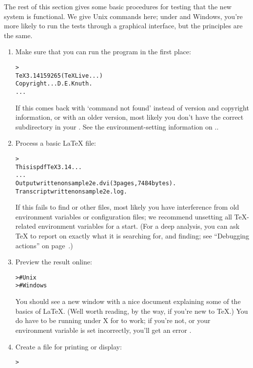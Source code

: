 \documentclass{article}
\begin{document}
The rest of this section gives some basic procedures for testing that
the new system is functional.  We give Unix commands here; under
\MacOSX{} and Windows, you're more likely to run the tests through a
graphical interface, but the principles are the same.

\begin{enumerate}

\item Make sure that you can run the  program in the first
place:
\begin{alltt}
> 
TeX 3.14159265 (TeX Live ...)
Copyright ... D.E. Knuth.
...
\end{alltt}
If this comes back with `command not found' instead of version and
copyright information, or with an older version, most likely you don't
have the correct  subdirectory in your .  See
the environment-setting information on \p.\pageref{sec:env}.

\item Process a basic \LaTeX{} file:
\begin{alltt}
> 
This is pdfTeX 3.14...
...
Output written on sample2e.dvi (3 pages, 7484 bytes).
Transcript written on sample2e.log.
\end{alltt}
If this fails to find  or other files, most
likely you have interference from old environment variables or
configuration files; we recommend unsetting all \TeX-related environment
variables for a start.  (For a deep analysis, you can ask \TeX{} to
report on exactly what it is searching for, and finding; see ``Debugging
actions'' on page~\pageref{sec:debugging}.)

\item Preview the result online:
\begin{alltt}
>     # Unix
>   # Windows
\end{alltt}
You should see a new window with a nice document explaining some of the
basics of \LaTeX{}.  (Well worth reading, by the way, if you're new to
\TeX.)  You do have to be running under X for  to work; if
you're not, or your  environment variable is set
incorrectly, you'll get an error .

\item Create a \PS{} file for printing or display:
\begin{alltt}
> 
\end{alltt}


\end{enumerate}
\end{document}
